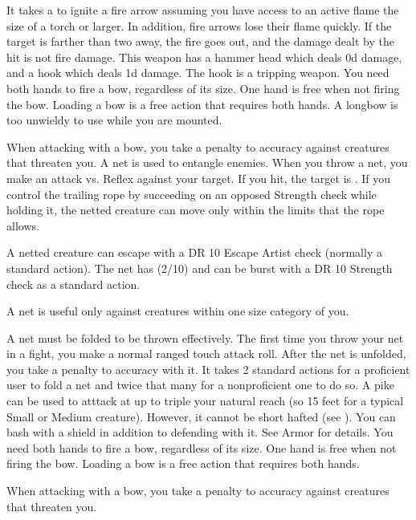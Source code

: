         It takes a  to ignite a fire arrow assuming you have access to an active flame the size of a torch or larger.
        In addition, fire arrows lose their flame quickly.
        If the target is farther than two  away, the fire goes out, and the damage dealt by the hit is not fire damage.
         This weapon has a hammer head which deals \plus0d damage, and a hook which deals \minus1d damage. The hook is a tripping weapon.
         You need both hands to fire a bow, regardless of its size. One hand is free when not firing the bow. Loading a bow is a free action that requires both hands. A longbow is too unwieldy to use while you are mounted.
        \par When attacking with a bow, you take a  penalty to accuracy against creatures that threaten you.
         A net is used to entangle enemies. When you throw a net, you make an attack vs. Reflex against your target. If you hit, the target is \slowed. If you control the trailing rope by succeeding on an opposed Strength check while holding it, the netted creature can move only within the limits that the rope allows.
        \par A netted creature can escape with a DR 10 Escape Artist check (normally a standard action). The net has (2/10) and can be burst with a DR 10 Strength check as a standard action.
        \par A net is useful only against creatures within one size category of you.
        \par A net must be folded to be thrown effectively. The first time you throw your net in a fight, you make a normal ranged touch attack roll. After the net is unfolded, you take a  penalty to accuracy with it. It takes 2 standard actions for a proficient user to fold a net and twice that many for a nonproficient one to do so.
         A pike can be used to atttack at up to triple your natural reach (so 15 feet for a typical Small or Medium creature).
        However, it cannot be short hafted (see ).
         You can bash with a shield in addition to defending with it. See Armor for details.
         You need both hands to fire a bow, regardless of its size. One hand is free when not firing the bow. Loading a bow is a free action that requires both hands.
        \par When attacking with a bow, you take a  penalty to accuracy against creatures that threaten you.
